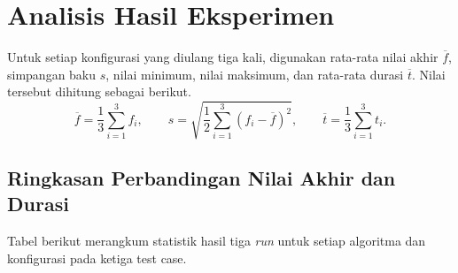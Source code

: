 \section{Analisis Hasil Eksperimen}

Untuk setiap konfigurasi yang diulang tiga kali, digunakan rata-rata nilai akhir $\overline{f}$, simpangan baku $s$, nilai minimum, nilai maksimum, dan rata-rata durasi $\overline{t}$. Nilai tersebut dihitung sebagai berikut.
\[
\overline{f} = \frac{1}{3}\sum_{i=1}^{3} f_i,
\qquad
s = \sqrt{\frac{1}{2}\sum_{i=1}^{3}(f_i-\overline{f})^2},
\qquad
\overline{t} = \frac{1}{3}\sum_{i=1}^{3} t_i.
\]

\subsection{Ringkasan Perbandingan Nilai Akhir dan Durasi}

Tabel berikut merangkum statistik hasil tiga \textit{run} untuk setiap algoritma dan konfigurasi pada ketiga test case.


